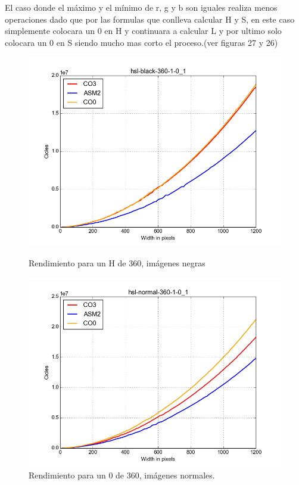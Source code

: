 \documentclass[a4paper]{article}
\begin{document}
El caso donde el máximo y el mínimo de r, g y b son iguales realiza menos operaciones dado que por las formulas que conlleva calcular H y S, en este caso simplemente colocara un 0 en H y continuara a calcular L y por ultimo solo colocara un 0 en S siendo mucho mas corto el proceso.(ver figuras 27 y 26)

\begin{figure}[H]
  \begin{center}
    \includegraphics[scale=0.4]{imagenes/hsl6.png}
    \caption{Rendimiento para un H de 360, imágenes negras}
    \label{fig:exp1-1}
  \end{center}
  \endminipage\hfill
  \begin{center}
    \includegraphics[scale=0.4]{imagenes/hsl5.png}
    \caption{Rendimiento para un 0 de 360, imágenes normales.}
    \label{fig:exp1-0.5}
  \end{center}
  \endminipage\hfill
\end{figure}
\end{document}
